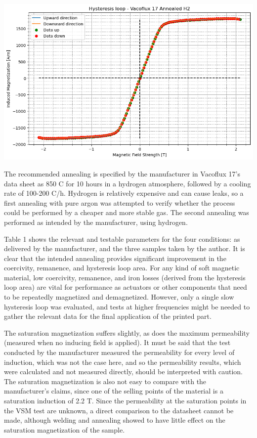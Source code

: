 \begin{minipage}{\linewidth}
    \centering
    \includegraphics[width=\linewidth]{images/annealed_H2.png}
    \label{fig:hysteresis_loop}
\end{minipage}

The recommended annealing is specified by the manufacturer in Vacoflux 17's data sheet as 850 C for 10 hours in a hydrogen atmosphere, followed by a cooling rate of 100-200 C/h. Hydrogen is relatively expensive and can cause leaks, so a first annealing with pure argon was attempted to verify whether the process could be performed by a cheaper and more stable gas. The second annealing was performed as intended by the manufacturer, using hydrogen.

Table 1 shows the relevant and testable parameters for the four conditions: as delivered by the manufacturer, and the three samples taken by the author. It is clear that the intended annealing provides significant improvement in the coercivity, remanence, and hysteresis loop area. For any kind of soft magnetic material, low coercivity, remanence, and iron losses (derived from the hysteresis loop area) are vital for performance as actuators or other components that need to be repeatedly magnetized and demagnetized. However, only a single slow hysteresis loop was evaluated, and tests at higher frequencies might be needed to gather the relevant data for the final application of the printed part.

The saturation magnetization suffers slightly, as does the maximum permeability (measured when no inducing field is applied). It must be said that the test conducted by the manufacturer measured the permeability for every level of induction, which was not the case here, and so the permeability results, which were calculated and not measured directly, should be interpreted with caution. The saturation magnetization is also not easy to compare with the manufacturer's claims, since one of the selling points of the material is a saturation induction of 2.2 T. Since the permeability at the saturation points in the VSM test are unknown, a direct comparison to the datasheet cannot be made, although welding and annealing showed to have little effect on the saturation magnetization of the sample. 


